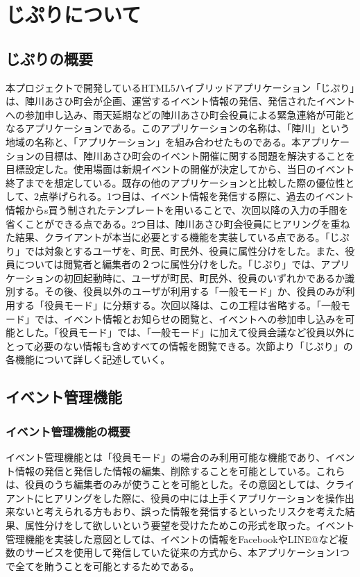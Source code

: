 \chapter{じぷりについて}

\section{じぷりの概要}%
本プロジェクトで開発しているHTML5ハイブリッドアプリケーション「じぷり」は、陣川あさひ町会が企画、運営するイベント情報の発信、発信されたイベントへの参加申し込み、雨天延期などの陣川あさひ町会役員による緊急連絡が可能となるアプリケーションである。このアプリケーションの名称は、「陣川」という地域の名称と、「アプリケーション」を組み合わせたものである。本アプリケーションの目標は、陣川あさひ町会のイベント開催に関する問題を解決することを目標設定した。使用場面は新規イベントの開催が決定してから、当日のイベント終了までを想定している。既存の他のアプリケーションと比較した際の優位性として、2点挙げられる。1つ目は、イベント情報を発信する際に、過去のイベント情報からs買う制されたテンプレートを用いることで、次回以降の入力の手間を省くことができる点である。2つ目は、陣川あさひ町会役員にヒアリングを重ねた結果、クライアントが本当に必要とする機能を実装している点である。「じぷり」では対象とするユーザを、町民、町民外、役員に属性分けをした。また、役員については閲覧者と編集者の２つに属性分けをした。「じぷり」では、アプリケーションの初回起動時に、ユーザが町民、町民外、役員のいずれかであるか識別する。その後、役員以外のユーザが利用する「一般モード」か、役員のみが利用する「役員モード」に分類する。次回以降は、この工程は省略する。「一般モード」では、イベント情報とお知らせの閲覧と、イベントへの参加申し込みを可能とした。「役員モード」では、「一般モード」に加えて役員会議など役員以外にとって必要のない情報も含めすべての情報を閲覧できる。次節より「じぷり」の各機能について詳しく記述していく。

\section{イベント管理機能}%
\subsection{イベント管理機能の概要}%
イベント管理機能とは「役員モード」の場合のみ利用可能な機能であり、イベント情報の発信と発信した情報の編集、削除することを可能としている。これらは、役員のうち編集者のみが使うことを可能とした。その意図としては、クライアントにヒアリングをした際に、役員の中には上手くアプリケーションを操作出来ないと考えられる方もおり、誤った情報を発信するといったリスクを考えた結果、属性分けをして欲しいという要望を受けたためこの形式を取った。イベント管理機能を実装した意図としては、イベントの情報をFacebookやLINE@など複数のサービスを使用して発信していた従来の方式から、本アプリケーション1つで全てを賄うことを可能とするためである。

